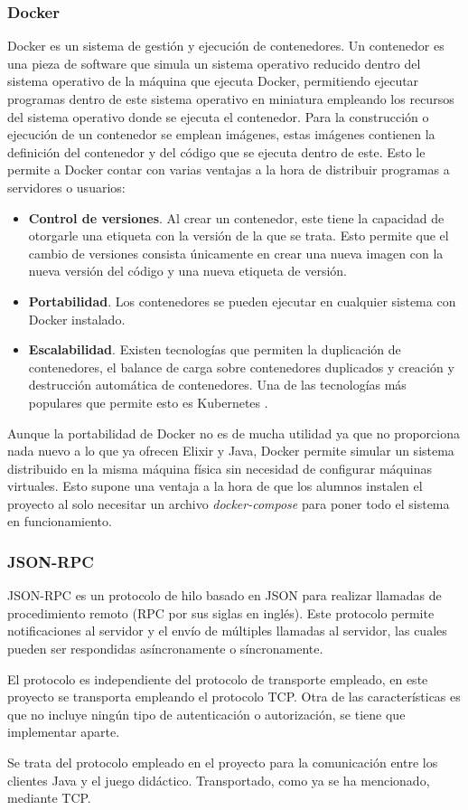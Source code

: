 \subsubsection{Docker}

Docker \cite{docker} es un sistema de gestión y ejecución de contenedores. Un contenedor es una pieza de software que simula un sistema operativo reducido dentro del sistema operativo de la máquina que ejecuta Docker, permitiendo ejecutar programas dentro de este sistema operativo en miniatura empleando los recursos del sistema operativo donde se ejecuta el contenedor. Para la construcción o ejecución de un contenedor se emplean imágenes, estas imágenes contienen la definición del contenedor y del código que se ejecuta dentro de este. Esto le permite a Docker contar con varias ventajas a la hora de distribuir programas a servidores o usuarios:

\begin{itemize}
	\item \textbf{Control de versiones}. Al crear un contenedor, este tiene la capacidad de otorgarle una etiqueta con la versión de la que se trata. Esto permite que el cambio de versiones consista únicamente en crear una nueva imagen con la nueva versión del código y una nueva etiqueta de versión.
	\item \textbf{Portabilidad}. Los contenedores se pueden ejecutar en cualquier sistema con Docker instalado.
	\item \textbf{Escalabilidad}. Existen tecnologías que permiten la duplicación de contenedores, el balance de carga sobre contenedores duplicados y creación y destrucción automática de contenedores. Una de las tecnologías más populares que permite esto es Kubernetes \cite{kubernetes}.
\end{itemize}

Aunque la portabilidad de Docker no es de mucha utilidad ya que no proporciona nada nuevo a lo que ya ofrecen Elixir y Java, Docker permite simular un sistema distribuido en la misma máquina física sin necesidad de configurar máquinas virtuales. Esto supone una ventaja a la hora de que los alumnos instalen el proyecto al solo necesitar un archivo \textit{docker-compose} para poner todo el sistema en funcionamiento.

\subsubsection{JSON-RPC}

JSON-RPC \cite{jsonrpc} es un protocolo de hilo basado en JSON para realizar llamadas de procedimiento remoto (RPC por sus siglas en inglés). Este protocolo permite notificaciones al servidor y el envío de múltiples llamadas al servidor, las cuales pueden ser respondidas asíncronamente o síncronamente.

El protocolo es independiente del protocolo de transporte empleado, en este proyecto se transporta empleando el protocolo TCP. Otra de las características es que no incluye ningún tipo de autenticación o autorización, se tiene que implementar aparte.

Se trata del protocolo empleado en el proyecto para la comunicación entre los clientes Java y el juego didáctico. Transportado, como ya se ha mencionado, mediante TCP.